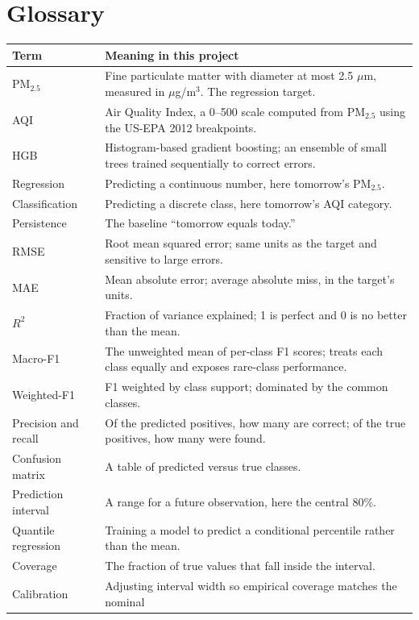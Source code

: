 \section{Glossary}
\label{app:glossary}

\begin{longtable}{@{}L{3.6cm}L{11.0cm}@{}}
\toprule
\textbf{Term} & \textbf{Meaning in this project} \\
\midrule
\endhead
\bottomrule
\endfoot
PM$_{2.5}$ & Fine particulate matter with diameter at most 2.5 $\mu$m, measured
in $\mu$g/m$^3$. The regression target. \\
AQI & Air Quality Index, a 0--500 scale computed from PM$_{2.5}$ using the US-EPA
2012 breakpoints. \\
HGB & Histogram-based gradient boosting; an ensemble of small trees trained
sequentially to correct errors. \\
Regression & Predicting a continuous number, here tomorrow's PM$_{2.5}$. \\
Classification & Predicting a discrete class, here tomorrow's AQI category. \\
Persistence & The baseline ``tomorrow equals today.'' \\
RMSE & Root mean squared error; same units as the target and sensitive to large
errors. \\
MAE & Mean absolute error; average absolute miss, in the target's units. \\
$R^2$ & Fraction of variance explained; 1 is perfect and 0 is no better than the
mean. \\
Macro-F1 & The unweighted mean of per-class F1 scores; treats each class equally
and exposes rare-class performance. \\
Weighted-F1 & F1 weighted by class support; dominated by the common classes. \\
Precision and recall & Of the predicted positives, how many are correct; of the
true positives, how many were found. \\
Confusion matrix & A table of predicted versus true classes. \\
Prediction interval & A range for a future observation, here the central 80\%. \\
Quantile regression & Training a model to predict a conditional percentile rather
than the mean. \\
Coverage & The fraction of true values that fall inside the interval. \\
Calibration & Adjusting interval width so empirical coverage matches the nominal

\end{longtable}
